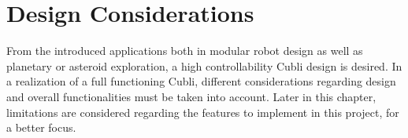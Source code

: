 \chapter{Design Considerations}\label{chap:designConsiderations}

From the introduced applications both in modular robot design as well as planetary or asteroid exploration, a high controllability Cubli design is desired.
In a realization of a full functioning Cubli, different considerations regarding design and overall functionalities must be taken into account. Later in this chapter, limitations are considered regarding the features to implement in this project, for a better focus.





